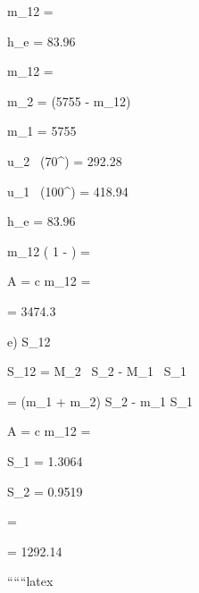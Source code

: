 \Delta m_{12} = 

h_e = 83.96 \, 

\Delta m_{12} = 

m_2 = (5755 - \Delta m_{12})

m_1 = 5755 \, 

u_2 \, (70^\circ) = 292.28 \, 

u_1 \, (100^\circ) = 418.94 \, 

h_e = 83.96

\Delta m_{12} \left( 1 -  \right) = 

 \quad A = c \quad \Delta m_{12} = 

= 3474.3 \, 

e) \quad \Delta S_{12} \quad {}  


\Delta S_{12} = M_2 \, S_2 - M_1 \, S_1

= (m_1 + m_2) S_2 - m_1 S_1

 \quad A = c \quad \Delta m_{12} = 

S_1 = 1.3064 \, 

S_2 = 0.9519 \, 

= 

= 1292.14 \, 

``````latex


